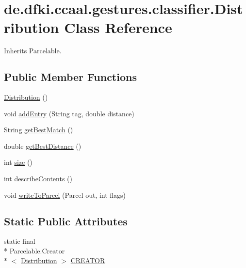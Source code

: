 \hypertarget{classde_1_1dfki_1_1ccaal_1_1gestures_1_1classifier_1_1_distribution}{\section{de.\-dfki.\-ccaal.\-gestures.\-classifier.\-Distribution Class Reference}
\label{classde_1_1dfki_1_1ccaal_1_1gestures_1_1classifier_1_1_distribution}
}


Inherits Parcelable.

\subsection*{Public Member Functions}
\begin{DoxyCompactItemize}
\item 
\hyperlink{classde_1_1dfki_1_1ccaal_1_1gestures_1_1classifier_1_1_distribution_af1b344495e30d39026c7fdf1d5112f8d}{Distribution} ()
\item 
void \hyperlink{classde_1_1dfki_1_1ccaal_1_1gestures_1_1classifier_1_1_distribution_ad08af7bd9f6641f9e60e4edc52536905}{add\-Entry} (String tag, double distance)
\item 
String \hyperlink{classde_1_1dfki_1_1ccaal_1_1gestures_1_1classifier_1_1_distribution_adc392a86d5e51a60fa1f3b4b83baebae}{get\-Best\-Match} ()
\item 
double \hyperlink{classde_1_1dfki_1_1ccaal_1_1gestures_1_1classifier_1_1_distribution_a7926d77330f92877544236874da418cf}{get\-Best\-Distance} ()
\item 
int \hyperlink{classde_1_1dfki_1_1ccaal_1_1gestures_1_1classifier_1_1_distribution_a4eb947ea2b3c428b401a5edcd990c832}{size} ()
\item 
int \hyperlink{classde_1_1dfki_1_1ccaal_1_1gestures_1_1classifier_1_1_distribution_aa9e531f3c13fb737b0b785e82a0838e6}{describe\-Contents} ()
\item 
void \hyperlink{classde_1_1dfki_1_1ccaal_1_1gestures_1_1classifier_1_1_distribution_aea8fad67a6de3232b411e1b91bfc5b1b}{write\-To\-Parcel} (Parcel out, int flags)
\end{DoxyCompactItemize}
\subsection*{Static Public Attributes}
\begin{DoxyCompactItemize}
\item 
static final \\*
Parcelable.\-Creator\\*
$<$ \hyperlink{classde_1_1dfki_1_1ccaal_1_1gestures_1_1classifier_1_1_distribution}{Distribution} $>$ \hyperlink{classde_1_1dfki_1_1ccaal_1_1gestures_1_1classifier_1_1_distribution_a8885e5148f2de9107352be5109b411f3}{C\-R\-E\-A\-T\-O\-R}
\end{DoxyCompactItemize}



